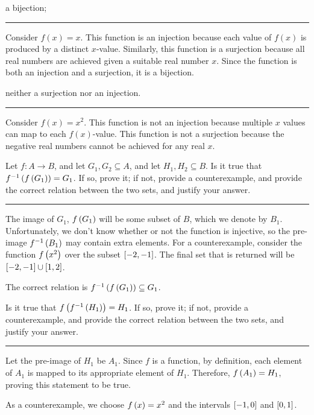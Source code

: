 \documentclass{article}
\begin{document}
\subproblema{}

a bijection;

\hrule

Consider $f(x) = x$.
This function is an injection because each value of $f(x)$ is produced by a distinct $x$-value.
Similarly, this function is a surjection because all real numbers are achieved given a suitable real number $x$.
Since the function is both an injection and a surjection, it is a bijection.

\subproblema{}

neither a surjection nor an injection.

\hrule

Consider $f(x) = x^2$.
This function is not an injection because multiple $x$ values can map to each $f(x)$-value.
This function is not a surjection because the negative real numbers cannot be achieved for any real $x$.

\problem{}
Let $f : A \to B$, and let $G_1, G_2 \subseteq A$, and let $H_1, H_2 \subseteq B$.
\subproblema{}
Is it true that $f^{-1} \left (f \left (G_1 \right) \right) = G_1$.
If so, prove it; if not, provide a counterexample, and provide the correct relation between the two sets, and justify your answer.
\hrule
The image of $G_1$, $f \left (G_1 \right)$ will be some subset of $B$, which we denote by $B_1$.
Unfortunately, we don't know whether or not the function is injective, so the pre-image $f^{-1} \left (B_1 \right)$ may contain extra elements.
For a counterexample, consider the function $f \left (x^2 \right)$ over the subset $\left [ -2, -1 \right]$.
The final set that is returned will be $\left [ -2, -1 \right] \cup \left [ 1, 2 \right]$.

The correct relation is $f^{-1} \left (f \left (G_1 \right) \right) \subseteq G_1$.

\subproblema{}
Is it true that $f \left (f^{-1} \left (H_1 \right) \right) = H_1$.
If so, prove it; if not, provide a counterexample, and provide the correct relation between the two sets, and justify your answer.
\hrule

Let the pre-image of $H_1$ be $A_1$.
Since $f$ is a function, by definition, each element of $A_1$ is mapped to its appropriate element of $H_1$.
Therefore, $f \left (A_1 \right) = H_1$, proving this statement to be true.

\subproblema{}
As a counterexample, we choose $f \left (x \right) = x^2$ and the intervals $ \left [ -1,0 \right]$ and $\left [ 0, 1 \right]$.
\end{document}
